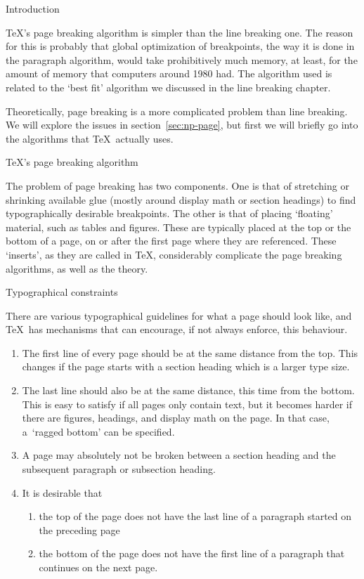  {Introduction}

\TeX's page breaking algorithm is simpler than the line breaking
one. The reason for this is probably that global optimization of
breakpoints, the way it is done in the paragraph algorithm, would take
prohibitively much memory, at least, for the amount of memory that
computers around 1980 had. The algorithm used is related to the `best
fit' algorithm we discussed in the line breaking chapter.

Theoretically, page breaking is a more complicated problem than line
breaking. We will explore the issues in section~\ref{sec:np-page}, but
first we will briefly go into the algorithms that \TeX\ actually uses.

 {\TeX's page breaking algorithm}

The problem of page breaking has two components. One is that of
stretching or shrinking available glue (mostly around display math or
section headings) to find typographically desirable breakpoints. The
other is that of placing `floating' material, such as tables and
figures. These are typically placed at the top or the bottom of a
page, on or after the first page where they are referenced. These
`inserts', as they are called in \TeX, considerably
complicate the page breaking algorithms, as well as the theory.

 {Typographical constraints}

There are various typographical guidelines for what a page should look
like, and \TeX\ has mechanisms that can encourage, if not always
enforce, this behaviour.
\begin{enumerate}
\item\label{it:topskip} The first line of every page should be at the
  same distance from the top. This changes if the page starts with a
  section heading which is a larger type size.
\item\label{it:maxdepth} The last line should also be at the same
  distance, this time from the bottom. This is easy to satisfy if all
  pages only contain text, but it becomes harder if there are figures,
  headings, and display math on the page. In that case, a~`ragged
  bottom' can be specified.
\item\label{it:pagenobreak} A page may absolutely not be broken
  between a section heading and the subsequent paragraph or subsection
  heading.
\item\label{it:widowclub} It is desirable that
\begin{enumerate}
\item\label{it:club} the top of the page does not have the last line
  of a paragraph started on the preceding page
\item\label{it:widow} the bottom of the page does not have the first
  line of a paragraph that continues on the next page.
\end{enumerate}
\end{enumerate}

